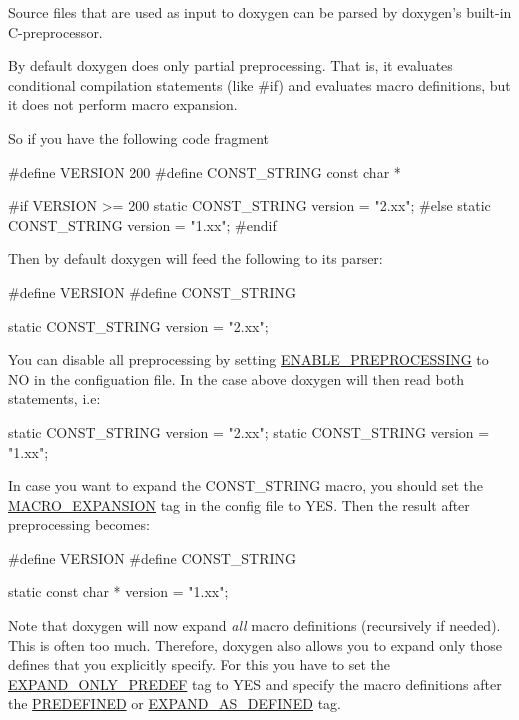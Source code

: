 Source files that are used as input to doxygen can be parsed by doxygen's built-\/in C-\/preprocessor.

By default doxygen does only partial preprocessing. That is, it evaluates conditional compilation statements (like \#if) and evaluates macro definitions, but it does not perform macro expansion.

So if you have the following code fragment \begin{DoxyVerb}
#define VERSION 200
#define CONST_STRING const char *

#if VERSION >= 200
  static CONST_STRING version = "2.xx";
#else
  static CONST_STRING version = "1.xx";
#endif
\end{DoxyVerb}


Then by default doxygen will feed the following to its parser:

\begin{DoxyVerb}
#define VERSION
#define CONST_STRING

  static CONST_STRING version = "2.xx";
\end{DoxyVerb}


You can disable all preprocessing by setting \hyperlink{config_cfg_enable_preprocessing}{ENABLE\_\-PREPROCESSING} to {\ttfamily NO} in the configuation file. In the case above doxygen will then read both statements, i.e:

\begin{DoxyVerb}
  static CONST_STRING version = "2.xx";
  static CONST_STRING version = "1.xx";
\end{DoxyVerb}


In case you want to expand the {\ttfamily CONST\_\-STRING} macro, you should set the \hyperlink{config_cfg_macro_expansion}{MACRO\_\-EXPANSION} tag in the config file to {\ttfamily YES}. Then the result after preprocessing becomes:

\begin{DoxyVerb}
#define VERSION
#define CONST_STRING

  static const char * version = "1.xx";
\end{DoxyVerb}


Note that doxygen will now expand {\itshape all\/} macro definitions (recursively if needed). This is often too much. Therefore, doxygen also allows you to expand only those defines that you explicitly specify. For this you have to set the \hyperlink{config_cfg_expand_only_predef}{EXPAND\_\-ONLY\_\-PREDEF} tag to {\ttfamily YES} and specify the macro definitions after the \hyperlink{config_cfg_predefined}{PREDEFINED} or \hyperlink{config_cfg_expand_as_defined}{EXPAND\_\-AS\_\-DEFINED} tag.

